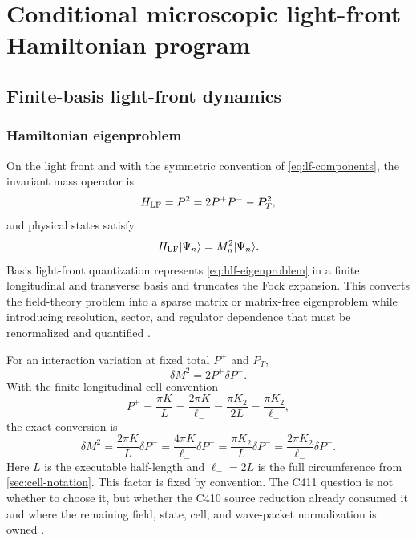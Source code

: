 \documentclass[11pt,oneside]{book}
\begin{document}
\part{Conditional microscopic light-front Hamiltonian program}

\chapter{Finite-basis light-front dynamics}
\label{chap:finite-basis}

\section{Hamiltonian eigenproblem}

On the light front and with the symmetric convention of \cref{eq:lf-components}, the invariant mass operator is
\begin{equation}
 H_{\rm LF}=P^2=2P^+P^- -\bm P_T^2,
 \label{eq:hlf-definition}
\end{equation}
and physical states satisfy
\begin{equation}
 H_{\rm LF}|\Psi_n\rangle=M_n^2|\Psi_n\rangle.
 \label{eq:hlf-eigenproblem}
\end{equation}
Basis light-front quantization represents \cref{eq:hlf-eigenproblem} in a finite longitudinal and transverse basis and truncates the Fock expansion.  This converts the field-theory problem into a sparse matrix or matrix-free eigenproblem while introducing resolution, sector, and regulator dependence that must be renormalized and quantified \cite{Dirac1949,BrodskyPauliPinsky1998,Vary2010,KarmanovMathiotSmirnov2008}.

For an interaction variation at fixed total $P^+$ and $P_T$,
\begin{equation}
 \delta M^2=2P^+\delta P^-.
 \label{eq:pminus-to-mass-squared}
\end{equation}
With the finite longitudinal-cell convention
\begin{equation}
 P^+=\frac{\pi K}{L}=\frac{2\pi K}{\ell_-}
 =\frac{\pi K_2}{2L}=\frac{\pi K_2}{\ell_-},
\end{equation}
the exact conversion is
\begin{equation}
 \boxed{\delta M^2=\frac{2\pi K}{L}\delta P^-
 =\frac{4\pi K}{\ell_-}\delta P^-
 =\frac{\pi K_2}{L}\delta P^-
 =\frac{2\pi K_2}{\ell_-}\delta P^-.}
 \label{eq:finite-cell-pminus-to-mass-squared}
\end{equation}
Here $L$ is the executable half-length and $\ell_-=2L$ is the full circumference from \cref{sec:cell-notation}.  This factor is fixed by convention.  The C411 question is not whether to choose it, but whether the C410 source reduction already consumed it and where the remaining field, state, cell, and wave-packet normalization is owned \cite{DWC411Record2026}.
\end{document}
